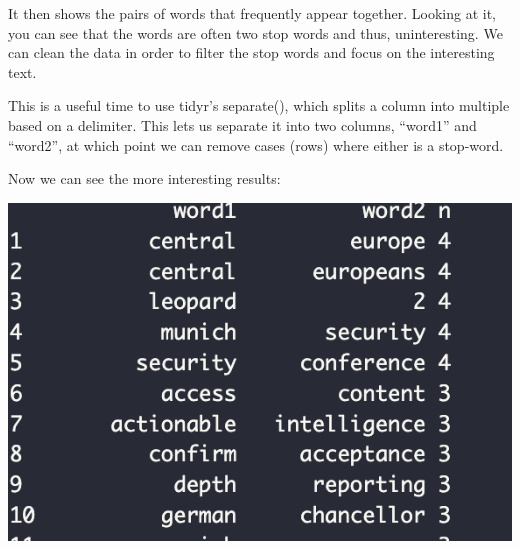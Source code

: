 \documentclass[
  letterpaper,
  DIV=11,
  numbers=noendperiod]{scrartcl}
\newenvironment{Shaded}{\begin{snugshade}}{\end{snugshade}}
\newcommand{\AttributeTok}[1]{\textcolor[rgb]{0.40,0.45,0.13}{#1}}
\newcommand{\CommentTok}[1]{\textcolor[rgb]{0.37,0.37,0.37}{#1}}
\newcommand{\ConstantTok}[1]{\textcolor[rgb]{0.56,0.35,0.01}{#1}}
\newcommand{\FunctionTok}[1]{\textcolor[rgb]{0.28,0.35,0.67}{#1}}
\newcommand{\NormalTok}[1]{\textcolor[rgb]{0.00,0.23,0.31}{#1}}
\newcommand{\OtherTok}[1]{\textcolor[rgb]{0.00,0.23,0.31}{#1}}
\newcommand{\SpecialCharTok}[1]{\textcolor[rgb]{0.37,0.37,0.37}{#1}}
\newcommand{\StringTok}[1]{\textcolor[rgb]{0.13,0.47,0.30}{#1}}
\begin{document}
It then shows the pairs of words that frequently appear together.
Looking at it, you can see that the words are often two stop words and
thus, uninteresting. We can clean the data in order to filter the stop
words and focus on the interesting text.

This is a useful time to use tidyr's separate(), which splits a column
into multiple based on a delimiter. This lets us separate it into two
columns, ``word1'' and ``word2'', at which point we can remove cases
(rows) where either is a stop-word.

\begin{Shaded}
\end{Shaded}

Now we can see the more interesting results:

\includegraphics{Images/4.png}
\end{document}
